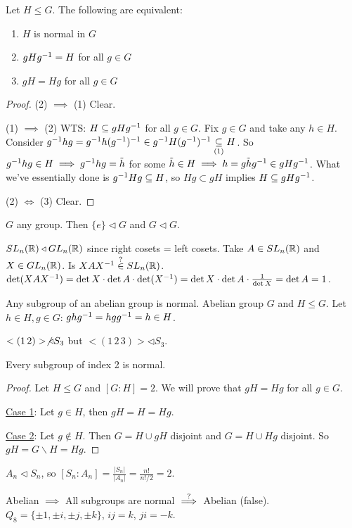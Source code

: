 \documentclass[]{article}
\begin{document}
\begin{theorem}
	Let $H\leq G$. The following are equivalent:
	\begin{enumerate}
		\item $H$ is normal in $G$
		\item $gHg^{-1} = H$ for all $g\in G$
		\item $gH = Hg$ for all $g\in G$
	\end{enumerate}
\end{theorem}
\begin{proof}
	(2) $\implies$ (1) Clear.

	(1) $\implies$ (2) WTS: $H \subseteq gHg^{-1}$ for all $g\in G$. Fix $g\in G$ and take any $h\in H$.
	Consider $g^{-1} hg = g^{-1} h(g^{-1})^{-1} \in g^{-1} H(g^{-1})^{-1} \underset{(1)}{\subseteq} H$. So $g^{-1} hg \in H \implies g^{-1} hg = \tilde h$ for some $\tilde h\in H \implies h = g\tilde h g^{-1}\in gHg^{-1}$.
	What we've essentially done is $g^{-1} Hg \subseteq H$, so $Hg \subset gH$ implies $H\subseteq gHg^{-1}$.

	(2) $\iff$ (3) Clear.
\end{proof}
\begin{example}
	$G$ any group. Then $\{e\} \triangleleft G$ and $G\triangleleft G$.
\end{example}
\begin{example}
	$SL_n(\mathbb{R}) \triangleleft GL_n(\mathbb{R})$ since right cosets = left cosets.
	Take $A\in SL_n(\mathbb{R})$ and $X\in GL_n(\mathbb{R})$. Is $XAX^{-1} \overset{?}{\in} SL_n(\mathbb{R})$. $\det(XAX^{-1}) = \det X\cdot \det A\cdot \det(X^{-1}) = \det X\cdot \det A \cdot \frac{1}{\det X} = \det A = 1$.
\end{example}
\begin{example}
	Any subgroup of an abelian group is normal. Abelian group $G$ and $H\leq G$. Let $h\in H,g\in G$: $ghg^{-1} = hgg^{-1} = h\in H$.
\end{example}
\begin{example}
	$<(1\,2)>\not\triangleleft S_3$ but $<(1\,2\,3)>\triangleleft S_3$.
\end{example}

\begin{theorem}
	Every subgroup of index 2 is normal.
\end{theorem}
\begin{proof}
	Let $H\leq G$ and $[G:H] = 2$. We will prove that $gH = Hg$ for all $g\in G$.

	\ul{Case 1}: Let $g\in H$, then $gH = H = Hg$.

	\ul{Case 2}: Let $g\notin H$. Then $G = H\cup gH$ disjoint and $G = H\cup Hg$ disjoint. So $gH = G\backslash H = Hg$.
\end{proof}
\begin{example}
	$A_n \triangleleft S_n$, so $[S_n:A_n] = \frac{|S_n|}{|A_n|} = \frac{n!}{n!/2} = 2$.
\end{example}
Abelian $\implies$ All subgroups are normal $\overset{?}{\implies}$ Abelian (false). $Q_8 = \{\pm 1,\pm i,\pm j, \pm k\}$, $ij = k$, $ji = -k$.
\end{document}
